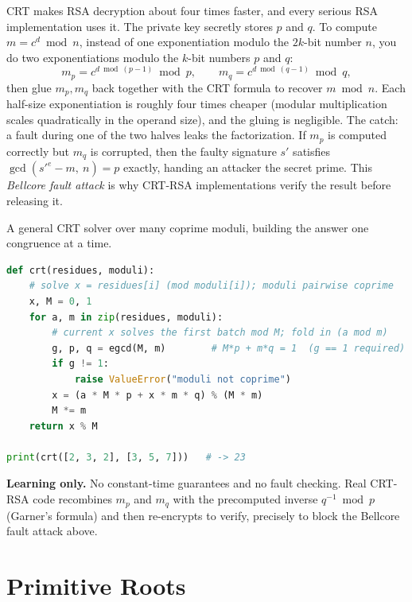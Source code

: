 \begin{applicationbox}
CRT makes RSA decryption about four times faster, and every serious RSA implementation uses it. The
private key secretly stores $p$ and $q$. To compute $m = c^d \bmod n$, instead of one exponentiation
modulo the $2k$-bit number $n$, you do two exponentiations modulo the $k$-bit numbers $p$ and $q$:
\[
  m_p = c^{d \bmod (p-1)} \bmod p, \qquad m_q = c^{d \bmod (q-1)} \bmod q,
\]
then glue $m_p, m_q$ back together with the CRT formula to recover $m \bmod n$. Each half-size
exponentiation is roughly four times cheaper (modular multiplication scales quadratically in the
operand size), and the gluing is negligible. The catch: a fault during one of the two halves leaks
the factorization. If $m_p$ is computed correctly but $m_q$ is corrupted, then the faulty signature
$s'$ satisfies $\gcd(s'^e - m,\ n) = p$ exactly, handing an attacker the secret prime. This
\emph{Bellcore fault attack} is why CRT-RSA implementations verify the result before releasing it.
\end{applicationbox}

\begin{implementbox}
A general CRT solver over many coprime moduli, building the answer one congruence at a time.

\begin{lstlisting}[language=Python]
def crt(residues, moduli):
    # solve x = residues[i] (mod moduli[i]); moduli pairwise coprime
    x, M = 0, 1
    for a, m in zip(residues, moduli):
        # current x solves the first batch mod M; fold in (a mod m)
        g, p, q = egcd(M, m)        # M*p + m*q = 1  (g == 1 required)
        if g != 1:
            raise ValueError("moduli not coprime")
        x = (a * M * p + x * m * q) % (M * m)
        M *= m
    return x % M

print(crt([2, 3, 2], [3, 5, 7]))   # -> 23
\end{lstlisting}

\textbf{Learning only.} No constant-time guarantees and no fault checking. Real CRT-RSA code
recombines $m_p$ and $m_q$ with the precomputed inverse $q^{-1} \bmod p$ (Garner's formula) and
then re-encrypts to verify, precisely to block the Bellcore fault attack above.
\end{implementbox}

\section{Primitive Roots}
\label{ch04:primitive-roots}

